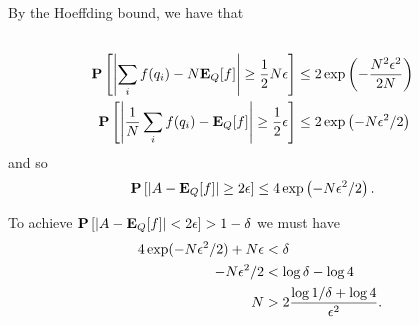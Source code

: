 \documentclass[11pt]{article} \usepackage{amssymb}
\newcommand{\E}{{\bf E}} \newcommand{\Cov}{{\bf Cov}}
\begin{document}
By the Hoeffding bound, we have that
\begin{align*}
\\  \P\left[\left|\sum_if(q_i)-N\E_Q[f]\right|\geq {1\over 2}N\epsilon\right] &\leq 
    2\exp\left(-{N^2\epsilon^2\over 2N}\right)
\\  \P\left[\left|{1\over N}\sum_if(q_i)-\E_Q[f]\right|\geq {1\over 2}\epsilon\right] &\leq 
    2\exp\left(-N\epsilon^2/2\right)
\end{align*}
and so
\begin{align*}
 \P\left[\left|A-\E_Q[f]\right|\geq 2\epsilon\right] &\leq 
    4\exp\left(-N\epsilon^2/2\right).
\end{align*}

To achieve $\P\left[\left|A-\E_Q[f]\right| < 2\epsilon\right]>1-\delta$
we must have
\begin{align*}
  4\exp(-N\epsilon^2/2)+N\epsilon&<\delta
  \\ -N\epsilon^2/2&<\log\delta-\log 4
  \\ N &> 2{\log 1/\delta+\log 4\over \epsilon^2}.
\end{align*}
\end{document}
